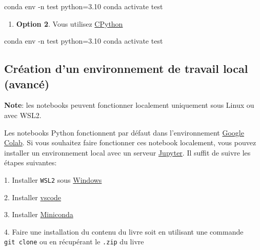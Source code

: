 \documentclass[
  11pt,
  letterpaper,
  open=any,
  twoside=false,
  french]{scrbook}
\newenvironment{Shaded}{\begin{snugshade}}{\end{snugshade}}
\newcommand{\AttributeTok}[1]{\textcolor[rgb]{0.40,0.45,0.13}{#1}}
\newcommand{\ExtensionTok}[1]{\textcolor[rgb]{0.00,0.23,0.31}{#1}}
\newcommand{\NormalTok}[1]{\textcolor[rgb]{0.00,0.23,0.31}{#1}}
\providecommand{\tightlist}{%
  \setlength{\itemsep}{0pt}\setlength{\parskip}{0pt}}\usepackage{longtable,booktabs,array}
\begin{document}
\begin{Shaded}
\begin{Highlighting}[]
\ExtensionTok{conda}\NormalTok{ env }\AttributeTok{{-}n}\NormalTok{ test python=3.10}
\ExtensionTok{conda}\NormalTok{ activate test}
\end{Highlighting}
\end{Shaded}

\begin{enumerate}
\def\labelenumi{\arabic{enumi}.}
\setcounter{enumi}{1}
\tightlist
\item
  \textbf{Option 2}. Vous utilisez
  \href{https://www.python.org/downloads/}{CPython}
\end{enumerate}

\begin{Shaded}
\begin{Highlighting}[]
\ExtensionTok{conda}\NormalTok{ env }\AttributeTok{{-}n}\NormalTok{ test python=3.10}
\ExtensionTok{conda}\NormalTok{ activate test}
\end{Highlighting}
\end{Shaded}

\subsection{Création d'un environnement de travail local
(avancé)}\label{cruxe9ation-dun-environnement-de-travail-local-avancuxe9}

\textbf{Note}: les notebooks peuvent fonctionner localement uniquement
sous Linux ou avec WSL2.

Les notebooks Python fonctionnent par défaut dans l'environnement
\href{https://colab.google/}{Google Colab}. Si vous souhaitez faire
fonctionner ces notebook localement, vous pouvez installer un
environnement local avec un serveur
\href{https://jupyterlab.readthedocs.io/en/stable/getting_started/starting.html}{Jupyter}.
Il suffit de suivre les étapes suivantes:

1. Installer \texttt{WSL2} sous
\href{https://learn.microsoft.com/en-us/windows/wsl/install}{Windows}

2. Installer
\href{https://code.visualstudio.com/docs/setup/windows}{vscode}

3. Installer
\href{https://docs.anaconda.com/miniconda/install/\#quick-command-line-install}{Miniconda}

4. Faire une installation du contenu du livre soit en utilisant une
commande \texttt{git\ clone} ou en récupérant le \texttt{.zip} du livre
\end{document}
